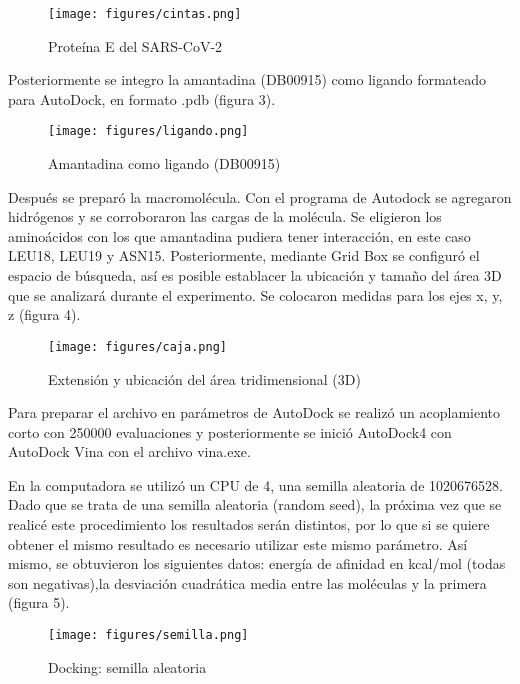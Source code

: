 \documentclass[12pt]{article}
\begin{document}
	 \begin{figure}[!ht]
 \centering
 \texttt{[image: figures/cintas.png]}
 \caption{Proteína E del SARS-CoV-2}
 \label{fig:exemplo}
\end{figure}
	
	
	
	Posteriormente se integro la amantadina (DB00915) como ligando formateado para AutoDock, en formato .pdb (figura 3).
	
	\begin{figure}[!ht]
 \centering
 \texttt{[image: figures/ligando.png]}
 \caption{Amantadina como ligando (DB00915)}
 \label{fig:exemplo}
\end{figure}
	
	
	
	Después se preparó la macromolécula. Con el programa de Autodock se agregaron hidrógenos y se corroboraron las cargas de la molécula. Se eligieron los aminoácidos con los que amantadina pudiera tener interacción, en este caso LEU18, LEU19 y ASN15. Posteriormente, mediante Grid Box se configuró el espacio de búsqueda, así es posible establacer la ubicación y tamaño del área 3D que se analizará durante el experimento. Se colocaron medidas para los ejes x, y, z (figura 4).
	
	\begin{figure}[!ht]
 \centering
 \texttt{[image: figures/caja.png]}
 \caption{Extensión y ubicación del área tridimensional (3D)}
 \label{fig:exemplo}
\end{figure}
	
	
	
	Para preparar el archivo en parámetros de AutoDock se realizó un acoplamiento corto con 250000 evaluaciones y posteriormente se inició AutoDock4 con AutoDock Vina con el archivo vina.exe.
	
	En la computadora se utilizó un CPU de 4, una semilla aleatoria de 1020676528. Dado que se trata de una semilla aleatoria (random seed), la próxima vez que se realicé este procedimiento los resultados serán distintos, por lo que si se quiere obtener el mismo resultado es necesario utilizar este mismo parámetro. Así mismo, se obtuvieron los siguientes datos: energía de afinidad en kcal/mol (todas son negativas),la desviación cuadrática media entre las moléculas y la primera (figura 5).
	
	\begin{figure}[!ht]
 \centering
 \texttt{[image: figures/semilla.png]}
 \caption{Docking: semilla aleatoria}
 \label{fig:exemplo}
\end{figure}
\end{document}

